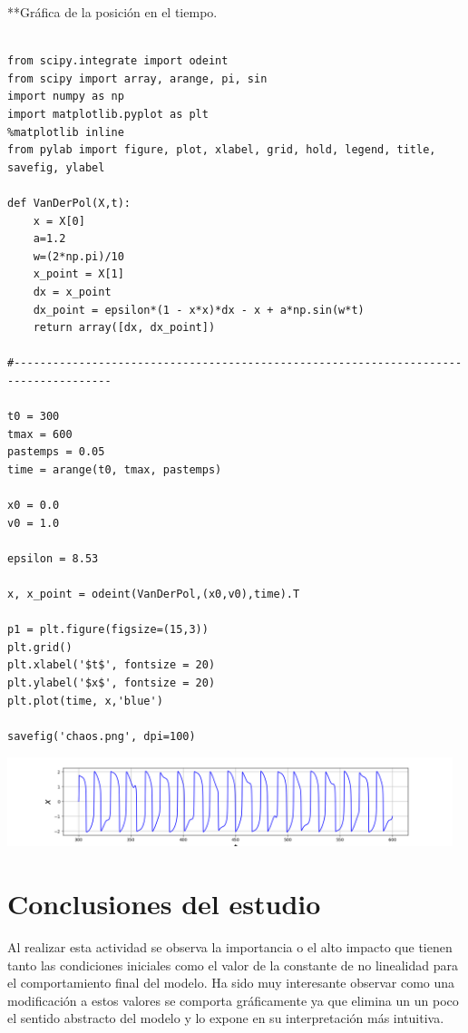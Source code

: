 \documentclass{article} %
\begin{document}
**Gráfica de la posición en el tiempo.

\begin{verbatim} 

from scipy.integrate import odeint 
from scipy import array, arange, pi, sin
import numpy as np
import matplotlib.pyplot as plt
%matplotlib inline
from pylab import figure, plot, xlabel, grid, hold, legend, title, savefig, ylabel

def VanDerPol(X,t):
    x = X[0]
    a=1.2
    w=(2*np.pi)/10
    x_point = X[1]
    dx = x_point
    dx_point = epsilon*(1 - x*x)*dx - x + a*np.sin(w*t)
    return array([dx, dx_point])

#-------------------------------------------------------------------------------------

t0 = 300
tmax = 600
pastemps = 0.05
time = arange(t0, tmax, pastemps)

x0 = 0.0
v0 = 1.0

epsilon = 8.53

x, x_point = odeint(VanDerPol,(x0,v0),time).T

p1 = plt.figure(figsize=(15,3))
plt.grid()
plt.xlabel('$t$', fontsize = 20)
plt.ylabel('$x$', fontsize = 20)
plt.plot(time, x,'blue')

savefig('chaos.png', dpi=100)

\end{verbatim}


\begin{center}
	\includegraphics[width=13cm]{chaos.png}
\end{center}


\section{Conclusiones del estudio}

Al realizar esta actividad se observa la importancia o el alto impacto que tienen tanto las condiciones iniciales como el valor de la constante de no linealidad para el comportamiento final del modelo. Ha sido muy interesante observar como una modificación a estos valores se comporta gráficamente ya que elimina un un poco el sentido abstracto del modelo y lo expone en su interpretación más intuitiva. 
\end{document}
